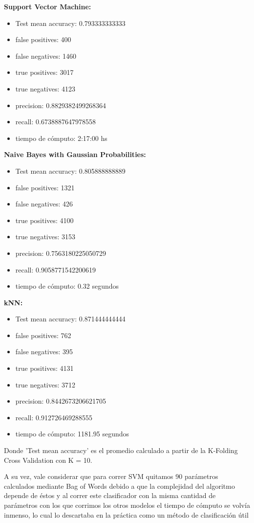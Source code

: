 \documentclass[10pt,a4paper]{article}
\begin{document}
\textbf{Support Vector Machine:}
\begin{itemize}
	\item Test mean accuracy: 0.793333333333
	\item false positives: 400
	\item false negatives: 1460
	\item true positives:  3017
	\item true negatives:  4123
	\item precision: 0.8829382499268364
	\item recall: 0.6738887647978558
	\item tiempo de cómputo: 2:17:00 hs
\end{itemize}

\textbf{Naive Bayes with Gaussian Probabilities:}
\begin{itemize}
	\item Test mean accuracy: 0.805888888889
	\item false positives: 1321
	\item false negatives: 426
	\item true positives:  4100
	\item true negatives:  3153
	\item precision: 0.7563180225050729
	\item recall: 0.9058771542200619
	\item tiempo de cómputo: 0.32 segundos
\end{itemize}

\textbf{kNN:}
\begin{itemize}
	\item Test mean accuracy: 0.871444444444
	\item false positives: 762
	\item false negatives: 395
	\item true positives:  4131
	\item true negatives:  3712
	\item precision: 0.8442673206621705
	\item recall: 0.912726469288555
	\item tiempo de cómputo: 1181.95 segundos
\end{itemize}


Donde 'Test mean accuracy' es el promedio calculado a partir de la K-Folding Cross Validation con K = 10.

A su vez, vale considerar que para correr SVM quitamos 90 parámetros calculados mediante Bag of Words debido a que la complejidad del algoritmo depende de éstos y al correr este clasificador con la misma cantidad de parámetros con los que corrimos los otros modelos el tiempo de cómputo se volvía inmenso, lo cual lo descartaba en la práctica como un método de clasificación útil
\end{document}
